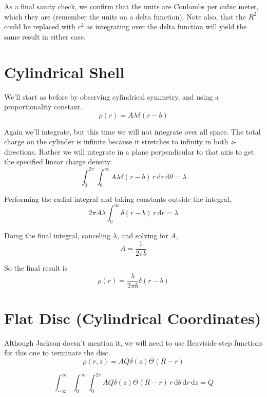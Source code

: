 \documentclass[10pt,a4paper]{article}
\begin{document}
As a final sanity check, we confirm that the units are Coulombs per cubic meter, which they are (remember the units on a delta function).  Note also, that the $R^2$ could be replaced with $r^2$ as integrating over the delta function will yield the same result in either case.

\section{Cylindrical Shell}
We'll start as before by observing cylindrical symmetry, and using a proportionality constant.
\begin{equation}
\rho(r) = A\lambda \delta(r-b)
\end{equation}

Again we'll integrate, but this time we will not integrate over all space. The total charge on the cylinder is infinite because it stretches to infinity in both $z$-directions. Rather we will integrate in a plane perpendicular to that axis to get the specified linear charge density.
\begin{equation}
\int_0^{2\pi}\int_0^\infty A\lambda\delta(r-b)\, r \,\mathrm{d}r\, \mathrm{d}\theta = \lambda
\end{equation}

Performing the radial integral and taking constants outside the integral,
\begin{equation}
2\pi A\lambda\int_0^\infty \delta(r-b)\,r\,\mathrm{d}r = \lambda
\end{equation}

Doing the final integral, canceling $\lambda$, and solving for $A$,
\begin{equation}
A=\frac{1}{2\pi b}
\end{equation}

So the final result is
\begin{equation}\boxed{
\rho(r)=\frac{\lambda}{2\pi b}\delta(r-b)
}\end{equation}

\section{Flat Disc (Cylindrical Coordinates)}
Although Jackson doesn't mention it, we will need to use Heaviside step functions for this one to terminate the disc.
\begin{equation}
\rho(r, z)=AQ\delta(z)\Theta(R-r)
\end{equation}

\begin{equation}
\int_{-\infty}^{\infty}\int_0^\infty\int_0^{2\pi}AQ\delta(z)\Theta(R-r)\,r\,\mathrm{d}\theta\,\mathrm{d}r\,\mathrm{d}z = Q
\end{equation}
\end{document}
